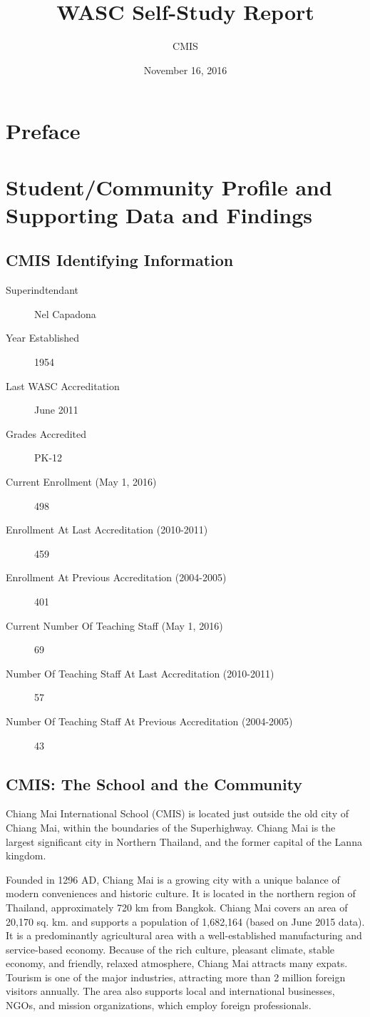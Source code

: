 \documentclass{report}
\title{WASC Self-Study Report}
\date{November 16, 2016}
\author{CMIS}
\begin{document}
\maketitle

\tableofcontents
\chapter{Preface}
\chapter[Student/Community Profile Data]{Student/Community Profile and Supporting Data and Findings}
\section{CMIS Identifying Information}
\begin{description}
\item[Superindtendant]
Nel Capadona
\item[Year Established]
1954
\item[Last WASC Accreditation]June 2011
\item[Grades Accredited]PK-12
\item[Current Enrollment (May 1, 2016)] 498
\item[Enrollment At Last Accreditation (2010-2011)] 459
\item[Enrollment At Previous Accreditation (2004-2005)]401
\item[Current Number Of Teaching Staff (May 1, 2016)]69
\item[Number Of Teaching Staff At Last Accreditation (2010-2011)]57
\item[Number Of Teaching Staff At Previous Accreditation (2004-2005)]43
\end{description}


\section{CMIS: The School and the Community}
Chiang Mai International School (CMIS) is located just outside the old city of Chiang Mai, within the boundaries of the Superhighway. Chiang Mai is the largest significant city in Northern Thailand, and the former capital of the Lanna kingdom.  

Founded in 1296 AD, Chiang Mai is a growing city with a unique balance of modern conveniences and historic culture.  It is located in the northern region of Thailand, approximately 720 km from Bangkok.  Chiang Mai covers an area of 20,170 sq. km. and supports a population of 1,682,164 (based on June 2015 data).  It is a predominantly agricultural area with a well-established manufacturing and service-based economy.  Because of the rich culture, pleasant climate, stable economy, and friendly, relaxed atmosphere, Chiang Mai attracts many expats.  Tourism is one of the major industries, attracting more than 2 million foreign visitors annually.  The area also supports local and international businesses, NGOs, and mission organizations, which employ foreign professionals.
\end{document}
